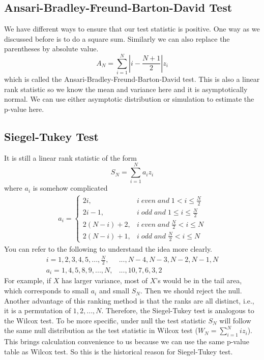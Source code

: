 \documentclass[twoside]{article}
\begin{document}
	\subsection{Ansari-Bradley-Freund-Barton-David Test}
	We have different ways to ensure that our test statistic is positive. One way as we discussed before is to do a square sum. Similarly we can also replace the parentheses by absolute value. 
	$$
	A_N = \sum_{i=1}^{N} \left| i - \frac{N+1}{2} \right| z_i
	$$
	which is called the Ansari-Bradley-Freund-Barton-David test. This is also a linear rank statistic so we know the mean and variance here and it is asymptotically normal. We can use either asymptotic distribution or simulation to estimate the p-value here. 
	\subsection{Siegel-Tukey Test}
	It is still a linear rank statistic of the form
	$$
	S_N = \sum_{i=1}^{N} a_i z_i
	$$
	where $a_i$ is somehow complicated
	\begin{align*}
		a_i = \begin{cases}
			2i, &i \; even \; and \; 1 < i \leqslant \frac{N}{2} \\
			2i - 1, &i \; odd \; and \; 1 \leqslant i \leqslant \frac{N}{2} \\
			2(N-i)+2, &i \; even \; and \; \frac{N}{2} < i \leqslant N \\
			2(N-i)+1, &i \; odd \; and \; \frac{N}{2} < i \leqslant N
		\end{cases}
	\end{align*}
	You can refer to the following to understand the idea more clearly. 
	\begin{align*}
		i = 1, 2, 3, 4, 5, ..., \frac{N}{2}, &..., N-4, N-3, N-2, N-1, N \\
		a_i = 1, 4, 5, 8, 9, ..., N, &..., 10, 7, 6, 3, 2
	\end{align*}
	For example, if $X$ has larger variance, most of $X$'s would be in the tail area, which corresponds to small $a_i$ and small $S_N$. Then we should reject the null. Another advantage of this ranking method is that the ranks are all distinct, i.e., it is a permutation of ${1, 2, ..., N}$. Therefore, the Siegel-Tukey test is analogous to the Wilcox test. To be more specific, under null the test statistic $S_N$ will follow the same null distribution as the test statistic in Wilcox test ($W_N = \sum_{i=1}^{N} i z_i$). This brings calculation convenience to us because we can use the same p-value table as Wilcox test. So this is the historical reason for Siegel-Tukey test. 
	
\end{document}
